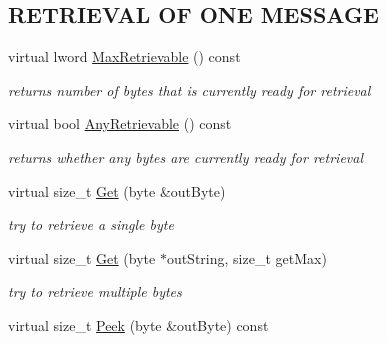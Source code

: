 \subsection*{RETRIEVAL OF ONE MESSAGE}
\label{_amgrpb55fc719003bf2121d292ca897e2b6bc}
 \begin{DoxyCompactItemize}
\item 
virtual lword \hyperlink{class_buffered_transformation_adf6654e3996270394552d67d2fda95d7}{MaxRetrievable} () const 
\begin{DoxyCompactList}\small\item\em returns number of bytes that is currently ready for retrieval \item\end{DoxyCompactList}\item 
\hypertarget{class_buffered_transformation_a6d6970882ec9e10549187a5737f56743}{
virtual bool \hyperlink{class_buffered_transformation_a6d6970882ec9e10549187a5737f56743}{AnyRetrievable} () const }
\label{class_buffered_transformation_a6d6970882ec9e10549187a5737f56743}

\begin{DoxyCompactList}\small\item\em returns whether any bytes are currently ready for retrieval \item\end{DoxyCompactList}\item 
\hypertarget{class_buffered_transformation_a198583ededc5f4316e1a8617a5d2a51b}{
virtual size\_\-t \hyperlink{class_buffered_transformation_a198583ededc5f4316e1a8617a5d2a51b}{Get} (byte \&outByte)}
\label{class_buffered_transformation_a198583ededc5f4316e1a8617a5d2a51b}

\begin{DoxyCompactList}\small\item\em try to retrieve a single byte \item\end{DoxyCompactList}\item 
\hypertarget{class_buffered_transformation_af1fa12ea7fa17445e2d367f3fc2b2152}{
virtual size\_\-t \hyperlink{class_buffered_transformation_af1fa12ea7fa17445e2d367f3fc2b2152}{Get} (byte $\ast$outString, size\_\-t getMax)}
\label{class_buffered_transformation_af1fa12ea7fa17445e2d367f3fc2b2152}

\begin{DoxyCompactList}\small\item\em try to retrieve multiple bytes \item\end{DoxyCompactList}\item 
\hypertarget{class_buffered_transformation_a83b354e74ec63c03a8456f70d8f149f5}{
virtual size\_\-t \hyperlink{class_buffered_transformation_a83b354e74ec63c03a8456f70d8f149f5}{Peek} (byte \&outByte) const }
\label{class_buffered_transformation_a83b354e74ec63c03a8456f70d8f149f5}


\end{DoxyCompactItemize}
